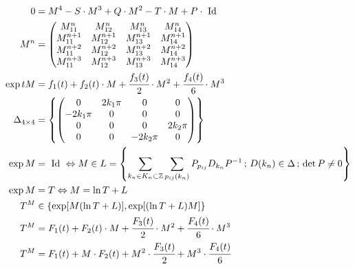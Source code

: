 \documentclass[12pt,a4paper]{article}
\begin{document}
\begin{align}
  0 &= M^4 - S\cdot M^3 + Q\cdot M^2 - T\cdot M + P\cdot\text{ Id } \\
   M^n &= \begin{pmatrix} M_{11}^n & M_{12}^n & M_{13}^n & M_{14}^n \\ M^{n+1}_{11} & M^{n+1}_{12} & M^{n+1}_{13}  & M^{n+1}_{14} \\ M^{n+2}_{11} & M^{n+2}_{12} & M^{n+2}_{13} & M^{n+2}_{14}  \\ M^{n+3}_{11} & M^{n+3}_{12} & M^{n+3}_{13} & M^{n+3}_{14}  \end{pmatrix} \\
 \exp tM &= f_1(t) + f_2(t) \cdot M + \cfrac{f_3(t)}{2} \cdot M^2 + \cfrac{f_4(t)}{6} \cdot M^3 \\
  \Delta_{4 \times 4} &= \left\{ \left( \begin{matrix} 0 & 2k_1\pi & 0 & 0 \\ -2k_1\pi & 0 & 0 & 0 \\ 0 & 0 & 0 & 2k_2\pi \\ 0 & 0 & - 2k_2\pi & 0 \end{matrix}\right)  \right\} \\
  \exp M &= \text{ Id } \Leftrightarrow M \in L = \left\{ \sum_{k_n \in K_n \subset \mathbb{Z}} \sum_{p_{ij}(k_n)} P_{p_{ij}} D_{k_n} P^{-1} \,;\, D(k_n) \in \Delta\,;\,\det P \ne 0 \right\} \\
  \exp M &= T \Leftrightarrow M = \ln T + L \\
  T^M &\in \{ \exp [M (\ln T + L)], \exp [(\ln T + L) M] \} \\
  T^M &= F_1(t) + F_2(t) \cdot M + \cfrac{F_3(t)}{2} \cdot M^2 + \cfrac{F_4(t)}{6} \cdot M^3  \\
  T^M &= F_1(t) + M \cdot F_2(t) + M^2 \cdot \cfrac{F_3(t)}{2} + M^3 \cdot \cfrac{F_4(t)}{6}
\end{align}
\end{document}
